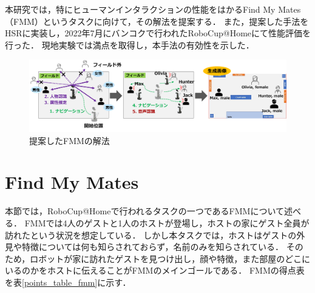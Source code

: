 \documentclass[a4j]{jarticle}
\begin{document}
本研究では，特にヒューマンインタラクションの性能をはかるFind My Mates（FMM）というタスクに向けて，その解法を提案する．
また，提案した手法をHSRに実装し，2022年7月にバンコクで行われたRoboCup@Homeにて性能評価を行った．
現地実験では満点を取得し，本手法の有効性を示した．

\begin{figure}[ht]
  \centering
  \includegraphics[width=16cm]{images/FMM/solution_overview_yoko_yy2.png}
  \caption{提案したFMMの解法}
  \label{solution_overview}
\end{figure}



\section{Find My Mates}
本節では，RoboCup@Homeで行われるタスクの一つであるFMMについて述べる．
FMMでは4人のゲストと1人のホストが登場し，ホストの家にゲスト全員が訪れたという状況を想定している．
しかし本タスクでは，ホストはゲストの外見や特徴については何も知らされておらず，名前のみを知らされている．
そのため，ロボットが家に訪れたゲストを見つけ出し，顔や特徴，また部屋のどこにいるのかをホストに伝えることがFMMのメインゴールである．
FMMの得点表を表\ref{points_table_fmm}に示す．
\end{document}
